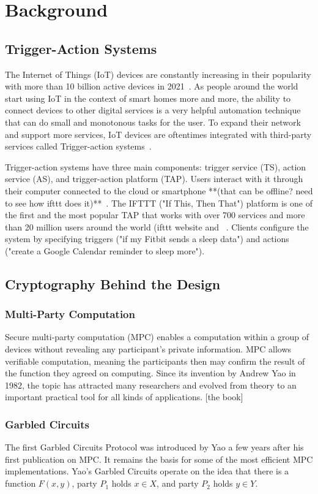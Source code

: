 \section{Background}
\label{sec:background}

\subsection{Trigger-Action Systems}

The Internet of Things (IoT) devices are constantly increasing in their popularity with more than 10 billion
active devices in 2021~\cite{DBLP:webpage/Bojan/IoTstats}. As people around the world start using IoT
in the context of smart homes more and more, the ability to connect devices to other digital services is a
very helpful automation technique that can do small and monotonous tasks for the user. To expand their
network and support more services, IoT devices are oftentimes integrated with third-party services called
Trigger-action systems~\cite{DBLP:journals/access/XuZZCDG19, DBLP:conf/chi/UrHBLMPSL16}.

Trigger-action systems have three main components: trigger service (TS), action service (AS), and
trigger-action platform (TAP). Users interact with it through their computer connected to the cloud or
smartphone **(that can be offline? need to see how ifttt does it)**~\cite{DBLP:conf/sp/ChenCWSCF21}.
The IFTTT ("If This, Then That") platform is one of the first and the most popular TAP that works with
over 700 services and more than 20 million users around the world (ifttt website and ~\cite{DBLP:conf/spChenCWSCF21}. Clients configure the system by specifying triggers ("if my Fitbit sends a sleep data")
and actions ("create a Google Calendar reminder to sleep more"). 


\subsection{Cryptography Behind the Design}

\subsubsection{Multi-Party Computation}

Secure multi-party computation (MPC) enables a computation within a group of devices without revealing
any participant's private information. MPC allows verifiable computation, meaning the participants then
may confirm the result of the function they agreed on computing. Since its invention by Andrew Yao in
1982, the topic has attracted many researchers and evolved from theory to an important practical tool for
all kinds of applications. [the book]


\subsubsection{Garbled Circuits}

The first Garbled Circuits Protocol was introduced by Yao a few years after his first publication on MPC. It remains the basis for some of the most efficient MPC implementations. Yao's Garbled Circuits operate on the idea that there is a function $F(x,y)$, party $P_1$ holds $x \in X$, and party $P_2$ holds $y \in Y$.